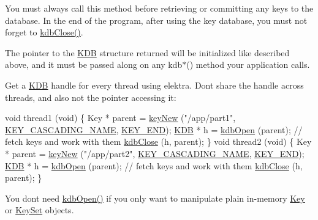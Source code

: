 You must always call this method before retrieving or committing any keys to the database. In the end of the program, after using the key database, you must not forget to \hyperlink{group__kdb_gadb54dc9fda17ee07deb9444df745c96f}{kdb\+Close()}.

The pointer to the {\ttfamily \hyperlink{classkdb_1_1KDB}{K\+DB}} structure returned will be initialized like described above, and it must be passed along on any kdb$\ast$() method your application calls.

Get a {\ttfamily \hyperlink{classkdb_1_1KDB}{K\+DB}} handle for every thread using elektra. Don\textquotesingle{}t share the handle across threads, and also not the pointer accessing it\+:


\begin{DoxyCodeInclude}
\textcolor{keywordtype}{void} thread1 (\textcolor{keywordtype}{void})
\{
        Key * parent = \hyperlink{group__key_gad23c65b44bf48d773759e1f9a4d43b89}{keyNew} (\textcolor{stringliteral}{"/app/part1"}, \hyperlink{group__key_gga9b703ca49f48b482def322b77d3e6bc8afc1567f74444ff9c219f7456b652b4ec}{KEY\_CASCADING\_NAME}, 
      \hyperlink{group__key_gga9b703ca49f48b482def322b77d3e6bc8aa8adb6fcb92dec58fb19410eacfdd403}{KEY\_END});
        \hyperlink{classkdb_1_1KDB_a7e0637995ce9f294cdbc6f167df6db40}{KDB} * h = \hyperlink{group__kdb_ga6808defe5870f328dd17910aacbdc6ca}{kdbOpen} (parent);
        \textcolor{comment}{// fetch keys and work with them}
        \hyperlink{group__kdb_gadb54dc9fda17ee07deb9444df745c96f}{kdbClose} (h, parent);
\}
\textcolor{keywordtype}{void} thread2 (\textcolor{keywordtype}{void})
\{
        Key * parent = \hyperlink{group__key_gad23c65b44bf48d773759e1f9a4d43b89}{keyNew} (\textcolor{stringliteral}{"/app/part2"}, \hyperlink{group__key_gga9b703ca49f48b482def322b77d3e6bc8afc1567f74444ff9c219f7456b652b4ec}{KEY\_CASCADING\_NAME}, 
      \hyperlink{group__key_gga9b703ca49f48b482def322b77d3e6bc8aa8adb6fcb92dec58fb19410eacfdd403}{KEY\_END});
        \hyperlink{classkdb_1_1KDB_a7e0637995ce9f294cdbc6f167df6db40}{KDB} * h = \hyperlink{group__kdb_ga6808defe5870f328dd17910aacbdc6ca}{kdbOpen} (parent);
        \textcolor{comment}{// fetch keys and work with them}
        \hyperlink{group__kdb_gadb54dc9fda17ee07deb9444df745c96f}{kdbClose} (h, parent);
\}
\end{DoxyCodeInclude}
 You don\textquotesingle{}t need \hyperlink{group__kdb_ga6808defe5870f328dd17910aacbdc6ca}{kdb\+Open()} if you only want to manipulate plain in-\/memory \hyperlink{classkdb_1_1Key}{Key} or \hyperlink{classkdb_1_1KeySet}{Key\+Set} objects.

